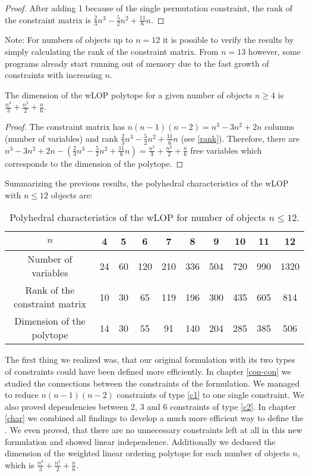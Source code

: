 \begin{proof}
	After adding 1 because of the single permutation constraint, the rank of the constraint matrix is $\frac{2}{3}n^3-\frac{5}{2}n^2+\frac{11}{6}n$.
	
\end{proof}
\newpage
Note: For numbers of objects up to $n=12$ it is possible to verify the results by simply calculating the rank of the constraint matrix. From $n=13$ however, some programs already start running out of memory due to the fast growth of constraints with increasing $n$.

\begin{corollary}
	The dimension of the wLOP polytope for a given number of objects $n \geq 4$ is $\frac{n^3}{3}+ \frac{n^2}{2} + \frac{n}{6}$.
\end{corollary}

\begin{proof}
	The constraint matrix has $n(n-1)(n-2)=n^3-3n^2+2n$ columns (number of variables) and rank $\frac{2}{3}n^3-\frac{5}{2}n^2+\frac{11}{6}n$ (see \ref{rank}). Therefore, there are $n^3-3n^2+2n - (\frac{2}{3}n^3-\frac{5}{2}n^2+\frac{11}{6}n) = \frac{n^3}{3}+ \frac{n^2}{2} + \frac{n}{6}$ free variables which corresponds to the dimension of the polytope.
	
\end{proof}

Summarizing the previous results, the polyhedral characteristics of the wLOP with $n \leq 12$ objects are:

\begin{table}[h]
	\centering
	\begin{tabular}{||c | c c c c c c c c c||} 
		\hline
		$n$ & 4 & 5 & 6 & 7 & 8 & 9 & 10 & 11 & 12\\ [0.5ex] 
		\hline\hline
		Number of variables & 24 & 60 & 120 & 210 & 336 & 504 & 720 & 990 & 1320 \\
		\hline
		Rank of the constraint matrix & 10 & 30 & 65 & 119 & 196 & 300 & 435 & 605 & 814 \\ 
		\hline
		Dimension of the polytope & 14 & 30 & 55 & 91 & 140 & 204 & 285 & 385 & 506 \\
		\hline
	\end{tabular}
	\caption{Polyhedral characteristics of the wLOP for number of objects $n \leq 12$.}
\end{table}

The first thing we realized was, that our original \ILP formulation with its two types of constraints could have been defined more efficiently. In chapter \ref{con-con} we studied the connections between the constraints of the \ILP formulation. We managed to reduce $n(n-1)(n-2)$ constraints of type \ref{c1} to one single constraint. We also proved dependencies between 2, 3 and 6 constraints of type \ref{c2}. In chapter \ref{char} we combined all findings to develop a much more efficient way to define the \ILP. We even proved, that there are no unnecessary constraints left at all in this new formulation and showed linear independence. Additionally we deduced the dimension of the weighted linear ordering polytope for each number of objects $n$, which is $\frac{n^3}{3}+ \frac{n^2}{2} + \frac{n}{6}$. \\


